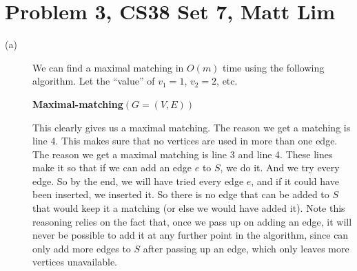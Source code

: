 \documentclass{article}
\begin{document}
\section*{Problem 3, CS38 Set 7, Matt Lim}
\begin{description}
    \item[(a)]
        We can find a maximal matching in $O(m)$ time using the following
        algorithm. Let the ``value'' of $v_1 = 1$, $v_2 = 2$, etc.

        \vspace{5mm}
        \noindent \textbf{Maximal-matching}$(G = (V,E))$

        This clearly gives us a maximal matching. The reason we get a
        matching is line 4. This makes sure that no vertices are used
        in more than one edge. The reason we get a maximal matching is
        line 3 and line 4. These lines make it so that if we can add an edge $e$
        to $S$, we do it. And we try every edge. So by the end, we will have
        tried every edge $e$, and if it could have been inserted, we inserted it. So
        there is no edge that can be added to $S$ that would keep it a matching
        (or else we would have added it). Note this reasoning relies on the fact
        that, once we pass up on adding an edge, it will never be possible to add
        it at any further point in the algorithm, since can only add more edges
        to $S$ after passing up an edge, which only leaves more vertices
        unavailable.


\end{description}
\end{document}
